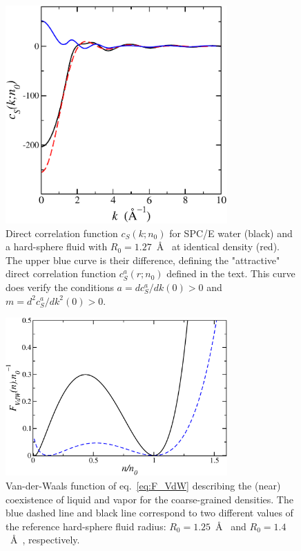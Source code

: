 \documentclass[aip,jcp,showpacs,amsmath,amssymb,superscriptaddress]{revtex4-1}
\begin{document}
\begin{figure}
    \includegraphics[width=8.5cm]{cS_of_k_spc_PY_127.pdf}
    \caption{Direct correlation function $c_S(k;n_0)$ for SPC/E water (black) and a hard-sphere fluid with $R_0= 1.27$~\AA~ at identical density (red). The upper blue curve is their difference, defining the "attractive" direct correlation function $c_S^a(r;n_0)$ defined   in the text. This curve does verify the conditions $a=dc_S^a/dk(0)  >0$ and $m = d^2c_S^a/dk^2(0) > 0$.
        \label{fig:ck_spc}
        }
\end{figure}

\begin{figure}
    \includegraphics[width=8.5cm]{F_VdW_R=125_R=14.pdf}
    \caption{Van-der-Waals function of eq.~\ref{eq:F_VdW} describing  the (near) coexistence of liquid and vapor for the coarse-grained densities. The blue dashed line and black line correspond to two different values of the reference hard-sphere fluid radius:  $R_0 = 1.25$~\AA~ and $R_0 = 1.4$~\AA~, respectively.
        \label{fig:fn}
        }
\end{figure}
\end{document}
